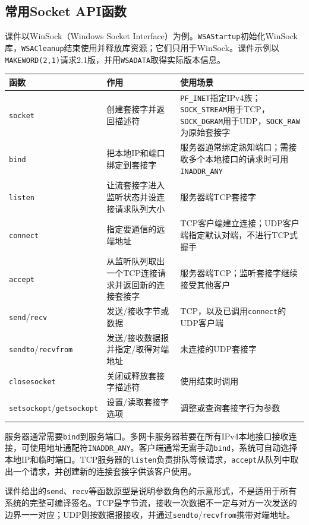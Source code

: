 \subsection{常用Socket API函数}
课件以WinSock（Windows Socket Interface）为例。\texttt{WSAStartup}初始化WinSock库，\texttt{WSACleanup}结束使用并释放库资源；它们只用于WinSock。课件示例以\texttt{MAKEWORD(2,1)}请求2.1版，并用\texttt{WSADATA}取得实际版本信息。

\begin{center}\begin{tabularx}{.98\textwidth}{lXX}\toprule
函数 & 作用 & 使用场景 \\\midrule
\texttt{socket} & 创建套接字并返回描述符 & \texttt{PF\_INET}指定IPv4族；\texttt{SOCK\_STREAM}用于TCP，\texttt{SOCK\_DGRAM}用于UDP，\texttt{SOCK\_RAW}为原始套接字 \\
\texttt{bind} & 把本地IP和端口绑定到套接字 & 服务器通常绑定熟知端口；需接收多个本地接口的请求时可用\texttt{INADDR\_ANY} \\
\texttt{listen} & 让流套接字进入监听状态并设连接请求队列大小 & 服务器端TCP套接字 \\
\texttt{connect} & 指定要通信的远端地址 & TCP客户端建立连接；UDP客户端指定默认对端，不进行TCP式握手 \\
\texttt{accept} & 从监听队列取出一个TCP连接请求并返回新的连接套接字 & 服务器端TCP；监听套接字继续接受其他客户 \\
\texttt{send}/\texttt{recv} & 发送/接收字节或数据 & TCP，以及已调用\texttt{connect}的UDP客户端 \\
\texttt{sendto}/\texttt{recvfrom} & 发送/接收数据报并指定/取得对端地址 & 未连接的UDP套接字 \\
\texttt{closesocket} & 关闭或释放套接字描述符 & 使用结束时调用 \\
\texttt{setsockopt}/\texttt{getsockopt} & 设置/读取套接字选项 & 调整或查询套接字行为参数 \\\bottomrule\end{tabularx}\end{center}

服务器通常需要\texttt{bind}到服务端口。多网卡服务器若要在所有IPv4本地接口接收连接，可使用地址通配符\texttt{INADDR\_ANY}。客户端通常无需手动\texttt{bind}，系统可自动选择本地IP和临时端口。TCP服务器的\texttt{listen}负责排队等候请求，\texttt{accept}从队列中取出一个请求，并创建新的连接套接字供该客户使用。

课件给出的\texttt{send}、\texttt{recv}等函数原型是说明参数角色的示意形式，不是适用于所有系统的完整可编译签名。TCP是字节流，接收一次数据不一定与对方一次发送的边界一一对应；UDP则按数据报接收，并通过\texttt{sendto}/\texttt{recvfrom}携带对端地址。


